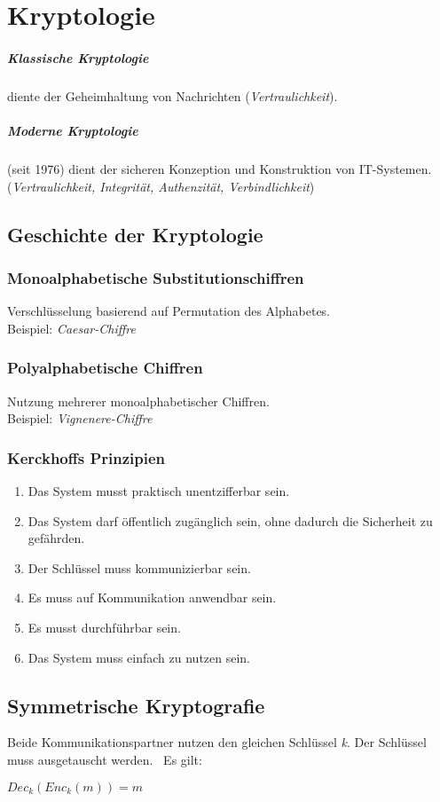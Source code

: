 \documentclass{report}
\begin{document}
\chapter{Kryptologie}
\paragraph{Klassische Kryptologie} diente der Geheimhaltung von Nachrichten (\textit{Vertraulichkeit}).
\paragraph{Moderne Kryptologie} (seit 1976) dient der sicheren Konzeption und Konstruktion von IT-Systemen. (\textit{Vertraulichkeit, Integrität, Authenzität, Verbindlichkeit})
\section{Geschichte der Kryptologie}
\subsection{Monoalphabetische Substitutionschiffren}
Verschlüsselung basierend auf Permutation des Alphabetes. \\
Beispiel: \textit{Caesar-Chiffre}
\subsection{Polyalphabetische Chiffren}
Nutzung mehrerer monoalphabetischer Chiffren. \\
Beispiel: \textit{Vignenere-Chiffre}
\subsection{Kerckhoffs Prinzipien}
\begin{enumerate}
    \item Das System musst praktisch unentzifferbar sein.
    \item Das System darf öffentlich zugänglich sein, ohne dadurch die Sicherheit zu gefährden.
    \item Der Schlüssel muss kommunizierbar sein.
    \item Es muss auf Kommunikation anwendbar sein.
    \item Es musst durchführbar sein.
    \item Das System muss einfach zu nutzen sein.
\end{enumerate}
\section{Symmetrische Kryptografie}
Beide Kommunikationspartner nutzen den gleichen Schlüssel \textit{k}. Der Schlüssel muss ausgetauscht werden. \
Es gilt: 
\begin{center}
    $Dec_{k}(Enc_{k}(m)) = m $
\end{center}
\end{document}
